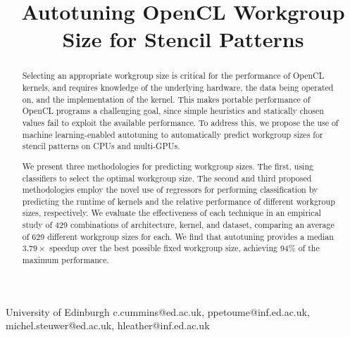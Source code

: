 \documentclass[preprint,nonatbib,10pt,nocopyrightspace]{sigplanconf}
\begin{document}
\setlength{\pdfpageheight}{\paperheight}
\setlength{\pdfpagewidth}{\paperwidth}






\title{Autotuning OpenCL Workgroup Size for Stencil Patterns}


           {University of Edinburgh}
           {c.cummins@ed.ac.uk, ppetoume@inf.ed.ac.uk, michel.steuwer@ed.ac.uk, hleather@inf.ed.ac.uk}

\maketitle

\begin{abstract}
  Selecting an appropriate workgroup size is critical for the
  performance of OpenCL kernels, and requires knowledge of the
  underlying hardware, the data being operated on, and the
  implementation of the kernel. This makes portable performance of
  OpenCL programs a challenging goal, since simple heuristics and
  statically chosen values fail to exploit the available
  performance. To address this, we propose the use of machine
  learning-enabled autotuning to automatically predict workgroup sizes
  for stencil patterns on CPUs and multi-GPUs.

  We present three methodologies for predicting workgroup sizes. The
  first, using classifiers to select the optimal workgroup size. The
  second and third proposed methodologies employ the novel use of
  regressors for performing classification by predicting the runtime
  of kernels and the relative performance of different workgroup
  sizes, respectively. We evaluate the effectiveness of each technique
  in an empirical study of 429 combinations of architecture, kernel,
  and dataset, comparing an average of 629 different workgroup sizes
  for each. We find that autotuning provides a median $3.79\times$
  speedup over the best possible fixed workgroup size, achieving 94\%
  of the maximum performance.
\end{abstract}
\end{document}
